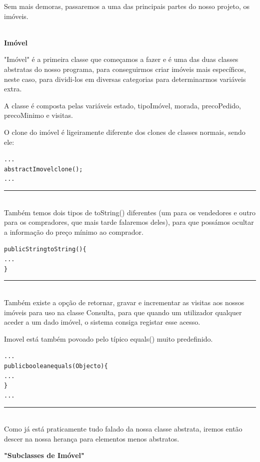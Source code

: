 \documentclass[12pt]{article}
\newenvironment{code}                    
{\textbf{
} \hspace{1cm} \hrulefill \\ 
\smallskip 
\begin{center}
\begin{minipage}{0.9\textwidth} 
\begin{alltt}\small}
{\end{alltt}
\end{minipage}
\end{center}
\hrule\smallskip
}
\begin{document}
Sem mais demoras, passaremos a uma das principais partes do nosso projeto, os imóveis.

\pagebreak

\textbf{\\Imóvel}
\newline

"Imóvel" é a primeira classe que começamos a fazer e é uma das duas classes abstratas do nosso programa, para conseguirmos criar imóveis mais específicos, neste caso, para dividi-los em diversas categorias para determinarmos variáveis extra. 
\newline

A classe é composta pelas variáveis estado, tipoImóvel, morada, precoPedido, precoMinimo e visitas. 
\newline

O clone do imóvel é ligeiramente diferente dos clones de classes normais, sendo ele:
\newline
\begin{code}

...
 abstract Imovel clone();
...

\end{code}
~\\

Também temos dois tipos de toString() diferentes (um para os vendedores e outro para os compradores, que mais tarde falaremos deles), para que possámos ocultar a informação do preço mínimo ao comprador.
\newline
\begin{code}
public String toString()\{
...
\}
\end{code}
~\\
Também existe a opção de retornar, gravar e incrementar as visitas aos nossos imóveis para uso na classe Consulta, para que quando um utilizador qualquer aceder a um dado imóvel, o sistema consiga registar esse acesso.
\newline

Imovel está também povoado pelo típico equals() muito predefinido.
\newline
\begin{code}
...
public boolean equals(Object o)\{
...
\}
...
\end{code}
~\\

Como já está praticamente tudo falado da nossa classe abstrata, iremos então descer na nossa herança para elementos menos abstratos.
\pagebreak

\textbf{"Subclasses de Imóvel"}
\newline
\end{document}
